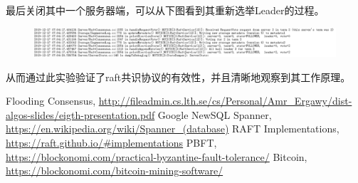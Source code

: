\documentclass[logo,reportComp]{thesis}
\begin{document}
\begin{answer}
最后关闭其中一个服务器端，可以从下图看到其重新选举Leader的过程。
\begin{figure}[H]
\centering
\includegraphics[width=\linewidth]{fig/re-election.png}
\end{figure}

从而通过此实验验证了raft共识协议的有效性，并且清晰地观察到其工作原理。
\end{answer}

\begin{thebibliography}{99}
 Flooding Consensus, \url{http://fileadmin.cs.lth.se/cs/Personal/Amr_Ergawy/dist-algos-slides/eigth-presentation.pdf}
 Google NewSQL Spanner, \url{https://en.wikipedia.org/wiki/Spanner_(database)}
 RAFT Implementations, \url{https://raft.github.io/\#implementations}
 PBFT, \url{https://blockonomi.com/practical-byzantine-fault-tolerance/}
 Bitcoin, \url{https://blockonomi.com/bitcoin-mining-software/}
\end{thebibliography}
\end{document}
